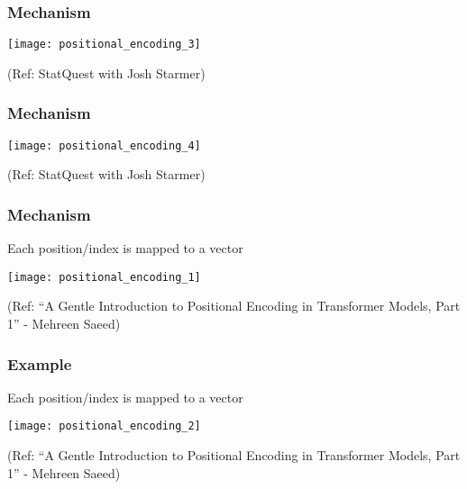 \begin{frame}[fragile]\frametitle{Mechanism}


\begin{center}
\texttt{[image: positional\_encoding\_3]}


{\tiny (Ref: StatQuest with Josh Starmer)}
\end{center}		

\end{frame}

\begin{frame}[fragile]\frametitle{Mechanism}


\begin{center}
\texttt{[image: positional\_encoding\_4]}


{\tiny (Ref: StatQuest with Josh Starmer)}
\end{center}		

\end{frame}

\begin{frame}[fragile]\frametitle{Mechanism}

Each position/index is mapped to a vector

\begin{center}
\texttt{[image: positional\_encoding\_1]}


{\tiny (Ref: ``A Gentle Introduction to Positional Encoding in Transformer Models, Part 1'' - Mehreen Saeed)}
\end{center}		

\end{frame}


\begin{frame}[fragile]\frametitle{Example}

Each position/index is mapped to a vector

\begin{center}
\texttt{[image: positional\_encoding\_2]}


{\tiny (Ref: ``A Gentle Introduction to Positional Encoding in Transformer Models, Part 1'' - Mehreen Saeed)}
\end{center}		

\end{frame}


